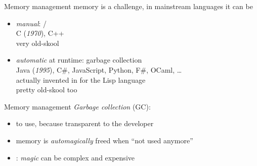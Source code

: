 \documentclass[10pt]{beamer}
\begin{document}
\begin{frame}{Memory management}
   memory is a challenge, in mainstream languages it can be
  \medskip
  \begin{itemize}\bigsep
    \item \emph{manual}:  / \\
      \prompt C (\emph{1970}), C++\\
      very old-skool
    \item \emph{automatic} at runtime: garbage collection\\
      \prompt Java (\emph{1995}), C\#, JavaScript, Python, F\#, OCaml, \ldots\\
      \pause
      actually invented in  for the Lisp language\\
      pretty old-skool too
  \end{itemize}
\end{frame}




\begin{frame}{Memory management}
  \emph{Garbage collection} (GC):
  \begin{itemize}
    \item {} to use, because transparent to the developer
    \item memory is \emph{automagically} freed when ``not used anymore''
    \item<2-> : \emph{magic} can be complex and expensive
  \end{itemize}
  \bigskip{}
  \bigskip
\end{frame}
\end{document}
